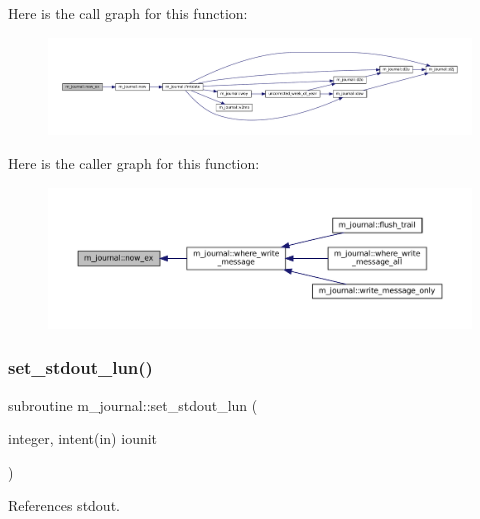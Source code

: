 Here is the call graph for this function\+:\nopagebreak
\begin{figure}[H]
\begin{center}
\leavevmode
\includegraphics[width=350pt]{namespacem__journal_a9c8074667748f2685122f2b3147e61d5_cgraph}
\end{center}
\end{figure}
Here is the caller graph for this function\+:\nopagebreak
\begin{figure}[H]
\begin{center}
\leavevmode
\includegraphics[width=350pt]{namespacem__journal_a9c8074667748f2685122f2b3147e61d5_icgraph}
\end{center}
\end{figure}
\mbox{\label{namespacem__journal_a8388800481a5e7ca022b52cfc56b9daf}} 
\subsubsection{\texorpdfstring{set\+\_\+stdout\+\_\+lun()}{set\_stdout\_lun()}}
{\footnotesize\ttfamily subroutine m\+\_\+journal\+::set\+\_\+stdout\+\_\+lun (\begin{DoxyParamCaption}\item[{integer, intent(in)}]{iounit }\end{DoxyParamCaption})\hspace{0.3cm}{\ttfamily [private]}}



References stdout.

\mbox{\label{namespacem__journal_aaa9769d86a12f3f850e425991c8bcff7}} 
